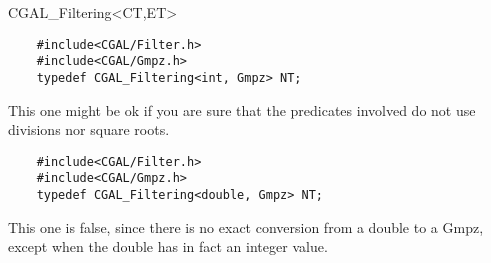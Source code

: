 \begin{ccClass} {CGAL_Filtering<CT,ET>}
\begin{verbatim}
    #include<CGAL/Filter.h>
    #include<CGAL/Gmpz.h>
    typedef CGAL_Filtering<int, Gmpz> NT;
\end{verbatim}

This one might be ok if you are sure that the predicates involved do not use
divisions nor square roots.

\begin{verbatim}
    #include<CGAL/Filter.h>
    #include<CGAL/Gmpz.h>
    typedef CGAL_Filtering<double, Gmpz> NT;
\end{verbatim}

This one is false, since there is no exact conversion from a double to a Gmpz,
except when the double has in fact an integer value.

\end{ccClass}
